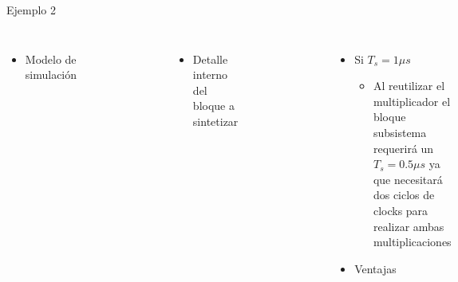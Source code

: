 \documentclass{beamer}
\begin{document}
\begin{frame}{Ejemplo 2}
\begin{columns}
\begin{itemize}
	\item Modelo de simulación
\end{itemize}
\begin{figure}
	\includegraphics[page=7, width=0.65\textwidth]{figs/figs.pdf}
\end{figure}
\begin{itemize}
	\item Detalle interno del bloque a sintetizar
\end{itemize}
\begin{figure}
	\includegraphics[page=8, width=0.8\textwidth]{figs/figs.pdf}
\end{figure}
\begin{itemize}
	\item Si $T_s=1\mu s$
	\begin{itemize}
		\item Al reutilizar el multiplicador el bloque subsistema requerirá un $T_s=0.5\mu s$ ya que necesitará dos ciclos de clocks para realizar ambas multiplicaciones
	\end{itemize}
	\item Ventajas

\end{itemize}
\end{columns}
\end{frame}
\end{document}
